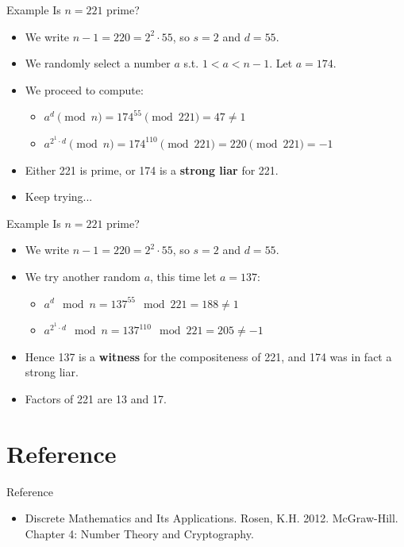 \documentclass{beamer}
\begin{document}
\begin{frame}{Example}
Is $n = 221$ prime?
    \begin{itemize}
        \item We write $n - 1 = 220 = 2^2 \cdot 55$, so $s = 2$ and $d = 55$.
        \item We randomly select a number $a$ s.t. $1 < a < n - 1$. Let $a = 174$. 
        \item We proceed to compute:
        \begin{itemize}
            \item $a^{d} \pmod{n} = 174^{55} \pmod{221} = 47 \neq 1$
            \item $a^{2^1 \cdot d} \pmod{n} = 174^{110} \pmod{221} = 220 \pmod{221} = -1$
        \end{itemize}
        \item Either 221 is prime, or 174 is a \textbf{strong liar} for 221.
        \item Keep trying...
    \end{itemize}
\end{frame}

\begin{frame}{Example}
Is $n = 221$ prime?
    \begin{itemize}
        \item We write $n - 1 = 220 = 2^2 \cdot 55$, so $s = 2$ and $d = 55$.
        \item We try another random $a$, this time let $a = 137$:
        \begin{itemize}
            \item $a^{d} \mod n = 137^{55} \mod 221 = 188 \neq 1$
            \item $a^{2^1 \cdot d} \mod n = 137^{110} \mod 221 = 205 \neq -1$
        \end{itemize}
        \item Hence 137 is a \textbf{witness} for the compositeness of 221, and 174 was in fact a strong liar.
        \item Factors of 221 are 13 and 17.
    \end{itemize}
\end{frame}

\section*{Reference}

\begin{frame}{Reference}
    \begin{itemize}
        \item Discrete Mathematics and Its Applications. Rosen, K.H. 2012. McGraw-Hill. \\
        Chapter 4: Number Theory and Cryptography.
    \end{itemize}
\end{frame}
\end{document}
